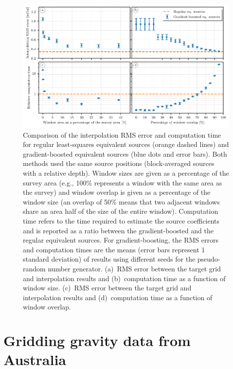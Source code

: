 \documentclass[twocolumn]{article}
\begin{document}
\begin{figure}
    \includegraphics[width=\linewidth]{figs/gradient-boosted-comparisons.pdf}
    \caption{
        Comparison of the interpolation RMS error and computation time for
        regular least-squares equivalent sources (orange dashed lines) and
        gradient-boosted equivalent sources (blue dots and error bars).
        Both methods used the same source positions (block-averaged sources
        with a relative depth).
        Window sizes are given as a percentage of the survey area (e.g., 100\%
        represents a window with the same area as the survey) and window
        overlap is given as a percentage of the window size 
        (an overlap of 50\% means that two adjacent windows
        share an area half of the size of the entire window).
        Computation time refers to the time required to estimate the source
        coefficients and is reported as a ratio between the gradient-boosted
        and the regular equivalent sources.
        For gradient-boosting, the RMS errors and computation times are the
        means (error bars represent 1 standard deviation) of results using
        different seeds for the pseudo-random number generator.
        (a)~RMS error between the target grid and interpolation results and
        (b)~computation time as a function of window size.
        (c)~RMS error between the target grid and interpolation results and
        (d)~computation time as a function of window overlap.
}
    \label{fig:gradient-boosted-comparison}
\end{figure}



\section{Gridding gravity data from Australia}
\end{document}
